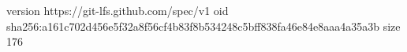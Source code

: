 version https://git-lfs.github.com/spec/v1
oid sha256:a161c702d456e5f32a8f56cf4b83f8b534248c5bff838fa46e84e8aaa4a35a3b
size 176
